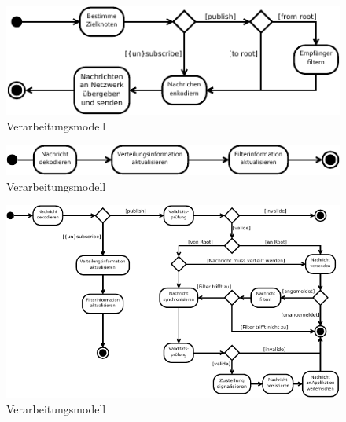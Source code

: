 \begin{figure}[htbp]
\centering
\includegraphics{grafics/processing_send.pdf}
\caption{Verarbeitungsmodell}
\label{fig:processing_send}
\end{figure}

\begin{figure}[htbp]
\centering
\includegraphics{grafics/processing_forward.pdf}
\caption{Verarbeitungsmodell}
\label{fig:processing_forward}
\end{figure}

\begin{figure}[htbp]
\centering
\includegraphics{grafics/processing_deliver.pdf}
\caption{Verarbeitungsmodell}
\label{fig:processing_deliver}
\end{figure}

